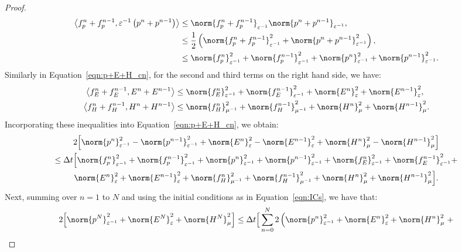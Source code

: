 \documentclass{amsart}
\theoremstyle{thmstyleone}%
\theoremstyle{thmstyletwo}%
\theoremstyle{thmstylethree}%
\newcommand{\aInnerproduct}[2]{\bigl\langle #1, #2 \bigr\rangle}
\begin{document}
\begin{proof}
\begin{align*}
  \aInnerproduct{f_p^n + f_p^{n - 1}}{\varepsilon^{-1} \left(p^n + p^{n - 1}\right)} &\le \norm{f_p^n + f_p^{n - 1}}_{\varepsilon^{-1}} \norm{p^n + p^{n - 1}}_{\varepsilon^{-1}}, \\
&\le \dfrac{1}{2} \left( \norm{f_p^n + f_p^{n - 1}}^2_{\varepsilon^{-1}} + \norm{p^n + p^{n - 1}}^2_{\varepsilon^{-1}} \right), \\
&\le \norm{f_p^n}^2_{\varepsilon^{-1}} + \norm{f_p^{n - 1}}^2_{\varepsilon^{-1}} + \norm{p^n}^2_{\varepsilon^{-1}} + \norm{p^{n - 1}}^2_{\varepsilon^{-1}}.
\end{align*}
Similarly in Equation~\eqref{eqn:p+E+H_cn}, for the second and third terms on the right hand side, we have:
\begin{align*}
\aInnerproduct{f_E^n + f_E^{n - 1}}{E^n + E^{n - 1}} & \le \norm{f_E^n}^2_{\varepsilon^{-1}} + \norm{f_E^{n - 1}}^2_{\varepsilon^{-1}} + \norm{E^n}^2_{\varepsilon} + \norm{E^{n - 1}}^2_{\varepsilon}, \\
\aInnerproduct{f_H^n + f_H^{n - 1}}{H^n + H^{n - 1}} &\le \norm{f_H^n}^2_{\mu^{-1}} + \norm{f_H^{n - 1}}^2_{\mu^{-1}} + \norm{H^n}^2_{\mu} + \norm{H^{n - 1}}^2_{\mu}.
\end{align*}
Incorporating these inequalities into Equation~\eqref{eqn:p+E+H_cn}, we obtain:
\begin{multline*}
  2 \Big[ \norm{p^n}^2_{\varepsilon^{-1}} - \norm{p^{n - 1}}^2_{\varepsilon^{-1}} + \norm{E^n}^2_{\varepsilon} - \norm{E^{n - 1}}^2_{\varepsilon} + \norm{H^n}^2_{\mu} - \norm{H^{n - 1}}^2_{\mu} \Big] \\
  \le \Delta t \Big[ \norm{f_p^n}^2_{\varepsilon^{-1}} + \norm{f_p^{n - 1}}^2_{\varepsilon^{-1}} + \norm{p^n}^2_{\varepsilon^{-1}} + \norm{p^{n - 1}}^2_{\varepsilon^{-1}} + \norm{f_E^n}^2_{\varepsilon^{-1}} + \norm{f_E^{n - 1}}^2_{\varepsilon^{-1}} + \\
  \norm{E^n}^2_{\varepsilon} + \norm{E^{n - 1}}^2_{\varepsilon} +
\norm{f_H^n}^2_{\mu^{-1}} + \norm{f_H^{n - 1}}^2_{\mu^{-1}} + \norm{H^n}^2_{\mu} + \norm{H^{n - 1}}^2_{\mu} \Big].
\end{multline*}
Next, summing over $n = 1$ to $N$ and using the initial conditions as in Equation~\eqref{eqn:ICs}, we have that:
\begin{multline*}
  2 \Big[ \norm{p^N}^2_{\varepsilon^{-1}} + \norm{E^N}^2_{\varepsilon} + \norm{H^N}^2_{\mu} \Big] \le \Delta t \Big[ \sum\limits_{n = 0}^{N} 2 \left( \norm{p^n}^2_{\varepsilon^{-1}} + \norm{E^n}^2_{\varepsilon} + \norm{H^n}^2_{\mu} \right. + \\

\end{multline*}
\end{proof}
\end{document}
